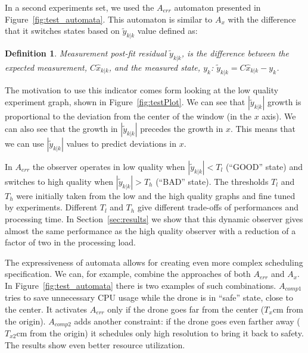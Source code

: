 \documentclass[ twoside, 12pt ]{article}
\newtheorem{dfn}{Definition} %
\begin{document}
In a second experiments set, we used the $A_{err}$ automaton presented in Figure~\ref{fig:test_automata}. This automaton is similar to $A_x$ with the difference that it switches states based on $\tilde{y}_{k|k}$ value  defined as:

\begin{dfn}{Measurement post-fit residual} 
    $\tilde{y}_{k|k}$, is the difference between the expected measurement, $C\hat{x}_{k|k}$, and the measured state, $y_k$: $\tilde{y}_{k|k} =  C\hat{x}_{k|k} - y_k $.%
\end{dfn}

The motivation to use this indicator comes form looking at the low quality experiment graph, shown in Figure~\ref{fig:testPlot}. We can see that $\left| \tilde{y}_{k|k} \right|$ growth is proportional to the deviation from the center of the window (in the $x$ axis). We can also see that the growth in $\left| \tilde{y}_{k|k} \right|$ precedes the growth in $x$. This means that we can use $\left| \tilde{y}_{k|k} \right|$ values to predict deviations in $x$.


In $A_{err}$ the observer operates in low quality when $\left| \tilde{y}_{k|k} \right| < T_{l}$ (``GOOD'' state) and switches to high quality when $\left| \tilde{y}_{k|k} \right| > T_{h}$ (``BAD'' state).
The thresholds $T_{l}$ and $T_{h}$ were initially taken from the low and the high quality graphs and fine tuned by experiments. 
Different $T_{l}$ and $T_{h}$ give different trade-offs of performances and processing time.
In Section~\ref{sec:results} we show that this dynamic observer gives almost the same performance as the high quality observer with a reduction of a factor of two in the processing load.

The expressiveness of automata allows for creating even more complex scheduling specification. We can, for example, combine the approaches of both $A_{err}$ and $A_{x}$.
In Figure~\ref{fig:test_automata} there is two examples of such combinations. $A_{comp1}$ tries to save unnecessary CPU usage while the drone is in ``safe'' state, close to the center. It activates $A_{err}$ only if the drone goes far from the center ($T_{x}$cm from the origin).
$A_{comp2}$ adds another constraint: if the drone goes even farther away ($T_{x2}$cm from the origin) it schedules only high resolution to bring it back to safety.
The results show even better resource utilization.
\end{document}
